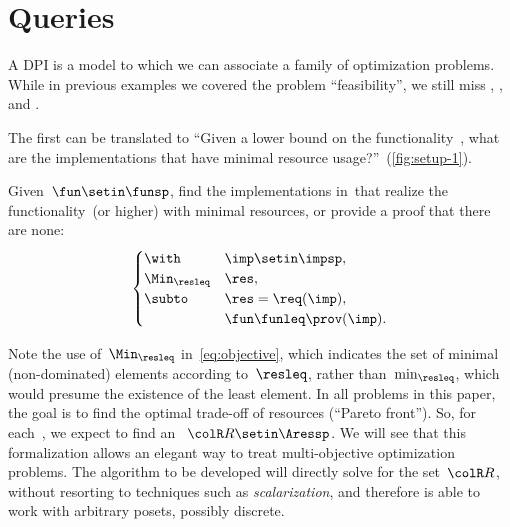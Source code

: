 
\section{Queries}
\label{sec:design-problems-querying}

A DPI is a model to which we can associate a family of optimization problems.
While in previous examples we covered the problem ``feasibility'', we still miss \FixFunMinRes, \FixResMaxFun, and \FeasibleImp.

The first can be translated to ``Given a lower bound on the functionality~\fun, what are the implementations that have minimal resource usage?''~(\cref{fig:setup-1}).

\begin{problem}[\FixFunMinRes]
\label{prob:FixFunMinRes}
Given~$\fun\setin\funsp$, find the implementations in~\impsp that realize the functionality~\fun (or higher) with minimal resources, or provide a proof that there are none:
\begin{equation}
    \label{eq:objective}
    \begin{cases}
        \with          & \imp\setin\impsp,       \\
        \Min_{\resleq} & \res,                   \\
        \subto         & \res=\req(\imp),        \\
                       & \fun\funleq\prov(\imp).
    \end{cases}
\end{equation}
\end{problem}

\begin{figure*}
    \centering
    \caption{}
    \label{fig:setup-1}
\end{figure*}

\begin{remark}
    Note the use of~$\Min_{\resleq}$ in~\cref{eq:objective},
    which indicates the set of minimal (non-dominated) elements according to~$\resleq$, rather than~$\min_{\resleq}$, which would presume the existence of the least element.
    In all problems in this paper, the goal is to find the optimal trade-off of resources (``Pareto front'').
    So, for each~\fun, we expect to find an   ~${\colR R}\setin\Aressp$.
    We will see that this formalization allows an elegant way to treat multi-objective optimization problems.
    The algorithm to be developed will directly solve for the set~${\colR R}$, without resorting to techniques such as \emph{scalarization}, and therefore is able to work with arbitrary posets, possibly discrete.
\end{remark}

